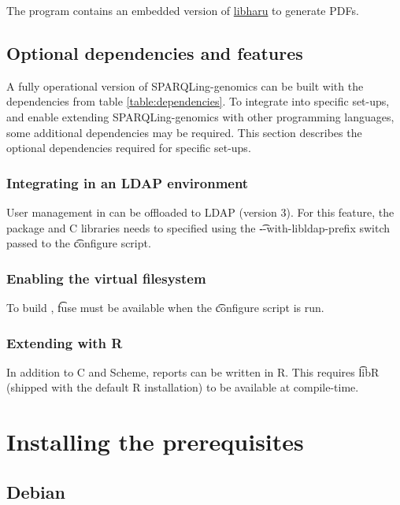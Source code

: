   The  program contains an embedded version of
  \href{https://github.com/libharu/libharu}{libharu} to generate PDFs.

\subsection{Optional dependencies and features}

  A fully operational version of SPARQLing-genomics can be built with the
  dependencies from table \ref{table:dependencies}.  To integrate into specific
  set-ups, and enable extending SPARQLing-genomics with other programming
  languages, some additional dependencies may be required.  This section
  describes the optional dependencies required for specific set-ups.

\subsubsection{Integrating  in an LDAP environment}

  User management in  can be offloaded to LDAP (version 3).
  For this feature, the  package and C libraries needs to
  specified using the \t{-{}-with-libldap-prefix} switch passed to the
  \t{configure} script.

\subsubsection{Enabling the virtual filesystem}

  To build , \t{fuse} must be available when the \t{configure}
  script is run.

\subsubsection{Extending  with R}

  In addition to C and Scheme, reports can be written in R.  This requires
  \t{libR} (shipped with the default R installation) to be available at
  compile-time.

\section{Installing the prerequisites}

\subsection{Debian}

